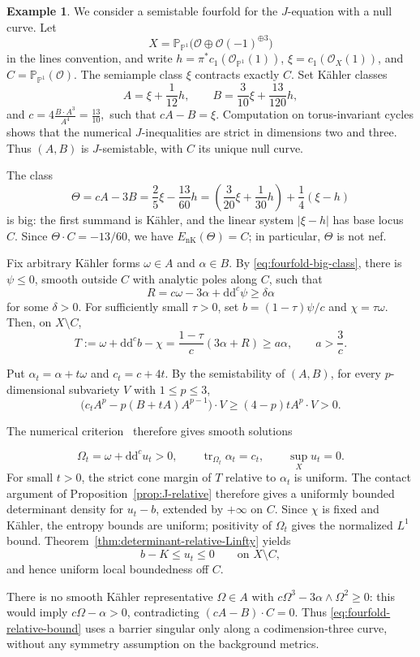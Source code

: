 \documentclass[oneside,english,letterpaper]{amsart}
\numberwithin{equation}{section}
\theoremstyle{plain}
\theoremstyle{definition}
\newtheorem{example}[thm]{Example}
\theoremstyle{remark}
\renewcommand{\d}{\mathrm{d}}
\newcommand{\ddc}{\d\d^c}
\begin{document}
\begin{example}
\label{ex:J-fourfold-null-curve}
We consider a semistable fourfold for the $J$-equation with a null curve.
Let
$$
X=\mathbb P_{\mathbb P^1}
\bigl(\mathcal O\oplus\mathcal O(-1)^{\oplus3}\bigr)
$$
in the lines convention, and write
$h=\pi^*c_1(\mathcal O_{\mathbb P^1}(1))$,
$\xi=c_1(\mathcal O_X(1))$, and
$C=\mathbb P_{\mathbb P^1}(\mathcal O)$.
The semiample class $\xi$ contracts exactly $C$. Set  K\"ahler classes 
$$
A=\xi+\frac1{12}h,\qquad
B=\frac3{10}\xi+\frac{13}{120}h,$$ and
$c=4\frac{B\cdot A^3}{A^4}=\frac{13}{10},
$
such that $cA-B=\xi$. Computation on
torus-invariant cycles shows that the numerical $J$-inequalities
are strict in dimensions two and three. Thus $(A,B)$ is
$J$-semistable, with $C$ its unique null curve.

The class
\begin{equation}\label{eq:fourfold-big-class}
\Theta=cA-3B
=\frac25\xi-\frac{13}{60}h
=\left(\frac3{20}\xi+\frac1{30}h\right)+\frac14(\xi-h)
\end{equation}
is big: the first summand is K\"ahler, and the linear system
$|\xi-h|$ has base locus $C$. Since $\Theta\cdot C=-13/60$,
we have $E_{\mathrm{nK}}(\Theta)=C$; in particular, $\Theta$ is not nef.

Fix arbitrary K\"ahler forms $\omega\in A$ and $\alpha\in B$.
By \eqref{eq:fourfold-big-class}, there is $\psi\leq0$, smooth
outside $C$ with analytic poles along $C$, such that
$$
R=c\omega-3\alpha+\ddc\psi\geq\delta\alpha
$$
for some $\delta>0$. For sufficiently small $\tau>0$, set
$b=(1-\tau)\psi/c$ and $\chi=\tau\omega$. Then, on $X\setminus C$,
$$
T:=\omega+\ddc b-\chi
=\frac{1-\tau}{c}(3\alpha+R)\geq a\alpha,
\qquad a>\frac3c.
$$

Put $\alpha_t=\alpha+t\omega$ and $c_t=c+4t$.
By the semistability of $(A,B)$, for every
$p$-dimensional subvariety $V$ with $1\leq p\leq3$,
\[
\bigl(c_tA^p-p(B+tA)A^{p-1}\bigr)\cdot V
\geq(4-p)tA^p\cdot V>0.
\]


The numerical criterion~\cite{MR4781476}
therefore gives smooth solutions

$$
\Omega_t=\omega+\ddc u_t>0,\qquad
\operatorname{tr}_{\Omega_t}\alpha_t=c_t,\qquad
\sup_Xu_t=0.
$$
For small $t>0$, the strict cone margin of $T$ relative to
$\alpha_t$ is uniform. The contact argument of
Proposition~\ref{prop:J-relative} therefore gives a uniformly
bounded determinant density for $u_t-b$, extended by $+\infty$
on $C$. Since $\chi$ is fixed and K\"ahler, the entropy bounds
are uniform; positivity of $\Omega_t$ gives the normalized $L^1$
bound. Theorem~\ref{thm:determinant-relative-Linfty} yields
\begin{equation}\label{eq:fourfold-relative-bound}
b-K\leq u_t\leq0\qquad\text{on }X\setminus C,
\end{equation}
and hence uniform local boundedness off $C$.

There is no smooth K\"ahler representative $\Omega\in A$ with
$c\Omega^3-3\alpha\wedge\Omega^2\geq0$: this would imply
$c\Omega-\alpha>0$, contradicting $(cA-B)\cdot C=0$.
Thus \eqref{eq:fourfold-relative-bound} uses a barrier singular
only along a codimension-three curve, without any symmetry
assumption on the background metrics.
\end{example}
\end{document}
